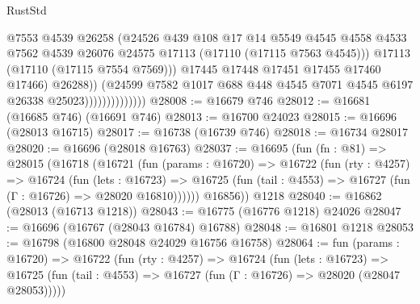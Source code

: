 \begin{lexlean}{RustStd}
\begin{coremodule}
                                      @7553
                                      @4539
                                      @26258
                                      (@24526
                                        @439
                                        @108
                                        @17
                                        @14
                                        @5549
                                        @4545
                                        @4558
                                        @4533
                                        @7562
                                        @4539
                                        @26076
                                        @24575
                                        @17113
                                        (@17110 (@17115 @7563 @4545)))
                                      @17113
                                      (@17110 (@17115 @7554 @7569)))
                                    @17445
                                    @17448
                                    @17451
                                    @17455
                                    @17460
                                    @17466)
                                  @26288))
                              (@24599
                                @7582
                                @1017
                                @688
                                @448
                                @4545
                                @7071
                                @4545
                                @6197
                                @26338
                                @25023))))))))))))))
@28008 := @16679 @746
@28012 := @16681 (@16685 @746) (@16691 @746)
@28013 := @16700 @24023
@28015 := @16696 (@28013 @16715)
@28017 := @16738 (@16739 @746)
@28018 := @16734 @28017
@28020 := @16696 (@28018 @16763)
@28037 := @16695
    (fun (fn : @81) =>
    @28015
      (@16718
        (@16721
          (fun (params : @16720) =>
          @16722
            (fun (rty : @4257) =>
            @16724
              (fun (lets : @16723) =>
              @16725 (fun (tail : @4553) => @16727 (fun (Γ : @16726) => @28020 @16810))))))
        @16856))
    @1218
@28040 := @16862 (@28013 (@16713 @1218))
@28043 := @16775 (@16776 @1218) @24026
@28047 := @16696 (@16767 (@28043 @16784) @16788)
@28048 := @16801 @1218
@28053 := @16798 (@16800 @28048 @24029 @16756 @16758)
@28064 := fun (params : @16720) =>
  @16722
    (fun (rty : @4257) =>
    @16724
      (fun (lets : @16723) =>
      @16725 (fun (tail : @4553) => @16727 (fun (Γ : @16726) => @28020 (@28047 @28053)))))

\end{coremodule}
\end{lexlean}
